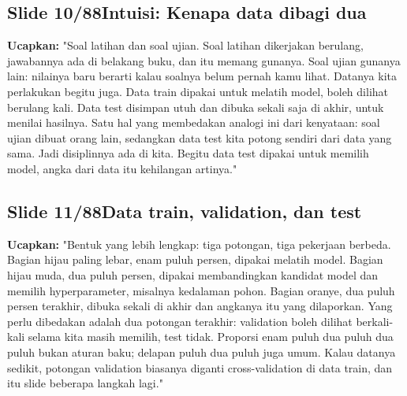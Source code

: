 \documentclass[11pt]{article}
\renewcommand{\framebox}[1]{\colorbox{acc!15}{\textcolor{acc}{\textbf{#1}}}}
\begin{document}
\subsection*{\framebox{Slide 10/88}\quad Intuisi: Kenapa data dibagi dua}
\textbf{Ucapkan:} "Soal latihan dan soal ujian. Soal latihan dikerjakan berulang, jawabannya ada di belakang buku, dan itu memang gunanya. Soal ujian gunanya lain: nilainya baru berarti kalau soalnya belum pernah kamu lihat. Datanya kita perlakukan begitu juga. Data train dipakai untuk melatih model, boleh dilihat berulang kali. Data test disimpan utuh dan dibuka sekali saja di akhir, untuk menilai hasilnya. Satu hal yang membedakan analogi ini dari kenyataan: soal ujian dibuat orang lain, sedangkan data test kita potong sendiri dari data yang sama. Jadi disiplinnya ada di kita. Begitu data test dipakai untuk memilih model, angka dari data itu kehilangan artinya."\\[2pt]

\subsection*{\framebox{Slide 11/88}\quad Data train, validation, dan test}
\textbf{Ucapkan:} "Bentuk yang lebih lengkap: tiga potongan, tiga pekerjaan berbeda. Bagian hijau paling lebar, enam puluh persen, dipakai melatih model. Bagian hijau muda, dua puluh persen, dipakai membandingkan kandidat model dan memilih hyperparameter, misalnya kedalaman pohon. Bagian oranye, dua puluh persen terakhir, dibuka sekali di akhir dan angkanya itu yang dilaporkan. Yang perlu dibedakan adalah dua potongan terakhir: validation boleh dilihat berkali-kali selama kita masih memilih, test tidak. Proporsi enam puluh dua puluh dua puluh bukan aturan baku; delapan puluh dua puluh juga umum. Kalau datanya sedikit, potongan validation biasanya diganti cross-validation di data train, dan itu slide beberapa langkah lagi."\\[2pt]
\end{document}
